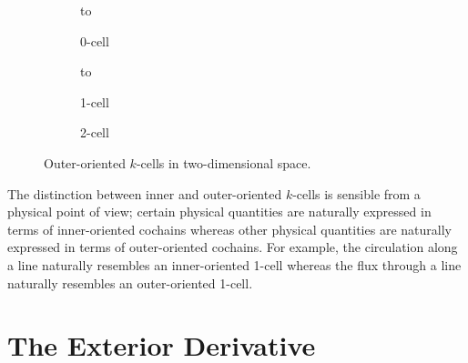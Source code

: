 \begin{figure}[ht]
    \newsavebox\outerBox
    \centering
    \begin{subfigure}[c]{0.3\textwidth}
        \centering
        \vbox to \ht{}
        \caption{0-cell}
    \end{subfigure}
    \begin{subfigure}[c]{0.3\textwidth}
        \centering
        \vbox to \ht{}
        \caption{1-cell}
    \end{subfigure}
    \begin{subfigure}[c]{0.3\textwidth}
        \centering
        \usebox{\outerBox}
        \caption{2-cell}
    \end{subfigure}
    \caption{Outer-oriented $k$-cells in two-dimensional space.}
    \label{fig:outerExample}
\end{figure}

The distinction between inner and outer-oriented $k$-cells is sensible from a physical point of view; certain physical quantities are naturally expressed in terms of inner-oriented cochains whereas other physical quantities are naturally expressed in terms of outer-oriented cochains. For example, the circulation along a line naturally resembles an inner-oriented 1-cell whereas the flux through a line naturally resembles an outer-oriented 1-cell.

\section{The Exterior Derivative}

